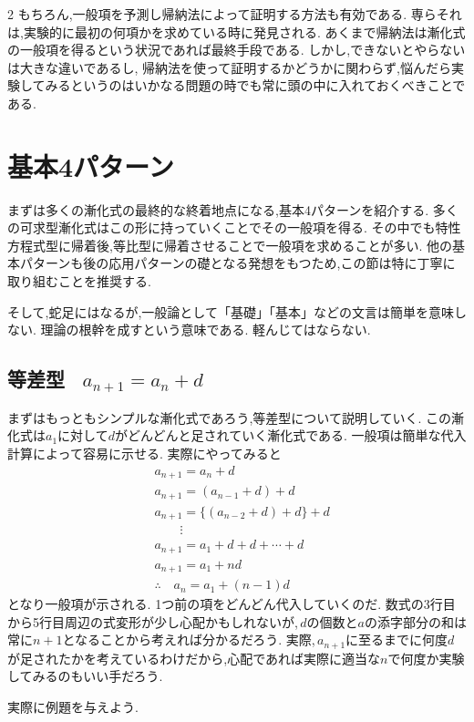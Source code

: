 \documentclass[dvipdfmx,a4paper,11pt,fleqn,openany]{jsbook}
\begin{document}
\begin{multicols*}{2}
    もちろん,一般項を予測し帰納法によって証明する方法も有効である.
    専らそれは,実験的に最初の何項かを求めている時に発見される.
    あくまで帰納法は漸化式の一般項を得るという状況であれば最終手段である.
    しかし,できないとやらないは大きな違いであるし,
    帰納法を使って証明するかどうかに関わらず,悩んだら実験してみるというのはいかなる問題の時でも常に頭の中に入れておくべきことである.
  \section{基本4パターン}
    まずは多くの漸化式の最終的な終着地点になる,基本4パターンを紹介する.
    多くの可求型漸化式はこの形に持っていくことでその一般項を得る.
    その中でも特性方程式型に帰着後,等比型に帰着させることで一般項を求めることが多い.
    他の基本パターンも後の応用パターンの礎となる発想をもつため,この節は特に丁寧に取り組むことを推奨する.
    
    そして,蛇足にはなるが,一般論として「基礎」「基本」などの文言は簡単を意味しない.
    理論の根幹を成すという意味である.
    軽んじてはならない.

    \subsection{等差型 \, $a_{n+1}=a_n+d$}
      まずはもっともシンプルな漸化式であろう,等差型について説明していく.
      この漸化式は$a_1$に対して$d$がどんどんと足されていく漸化式である.
      一般項は簡単な代入計算によって容易に示せる.
      実際にやってみると
      \begin{align*}
        &a_{n+1}=a_n+d\\
        &a_{n+1}=(a_{n-1}+d)+d\\
        &a_{n+1}=\{(a_{n-2}+d)+d\}+d\\
        &\qquad \vdots\\
        &a_{n+1}=a_1+d+d+\cdots+d\\
        &a_{n+1}=a_1+nd\\
        &\therefore \quad a_n=a_1+(n-1)d
      \end{align*}
      となり一般項が示される.
      1つ前の項をどんどん代入していくのだ.
      数式の3行目から5行目周辺の式変形が少し心配かもしれないが,\,$d$の個数と$a$の添字部分の和は常に$n+1$となることから考えれば分かるだろう.
      実際,\,$a_{n+1}$に至るまでに何度$d$が足されたかを考えているわけだから,心配であれば実際に適当な$n$で何度か実験してみるのもいい手だろう.

      実際に例題を与えよう.


\end{multicols*}
\end{document}
